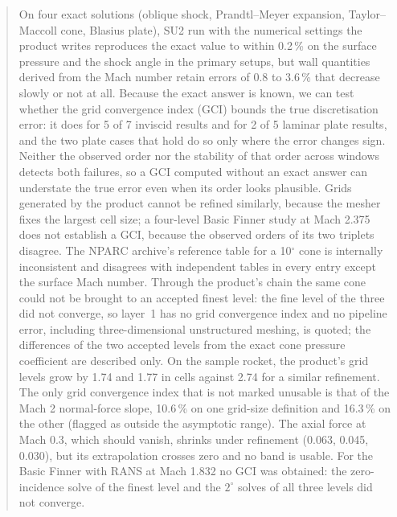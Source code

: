 \documentclass[11pt,a4paper]{article}
\begin{document}
\begin{abstract}
On four exact solutions (oblique shock, Prandtl--Meyer expansion, Taylor--Maccoll cone, Blasius plate),
SU2 run with the numerical settings the product writes reproduces the exact value to within 0.2\,\% on the
surface pressure and the shock angle in the primary setups, but wall quantities derived from the Mach number retain
errors of 0.8 to 3.6\,\% that decrease slowly or not at all.
Because the exact answer is known, we can test whether the grid convergence index (GCI) bounds the true
discretisation error: it does for 5 of 7 inviscid results and for 2 of 5 laminar plate results, and the two
plate cases that hold do so only where the error changes sign.
Neither the observed order nor the stability of that order across windows detects both failures, so a GCI
computed without an exact answer can understate the true error even when its order looks plausible.
Grids generated by the product cannot be refined similarly, because the mesher fixes the largest cell size;
a four-level Basic Finner study at Mach 2.375 does not establish a GCI, because the observed orders of its two
triplets disagree.
The NPARC archive's reference table for a 10$^\circ$ cone is internally inconsistent and disagrees with independent
tables in every entry except the surface Mach number.
Through the product's chain the same cone could not be brought to an accepted finest level: the fine level of the three
did not converge, so layer~1 has no grid convergence index and no pipeline error, including three-dimensional
unstructured meshing, is quoted; the differences of the two accepted levels from the exact cone pressure coefficient
are described only.
On the sample rocket, the product's grid levels grow by 1.74 and 1.77 in cells against 2.74 for a similar refinement.
The only grid convergence index that is not marked unusable is that of the Mach 2 normal-force slope, 10.6\,\% on one grid-size
definition and 16.3\,\% on the other (flagged as outside the asymptotic range).
The axial force at Mach 0.3, which should vanish, shrinks under refinement (0.063, 0.045, 0.030), but its extrapolation crosses zero and no band is usable.
For the Basic Finner with RANS at Mach 1.832 no GCI was obtained: the zero-incidence solve of the finest level and the
$2^\circ$ solves of all three levels did not converge.

\end{abstract}
\end{document}

